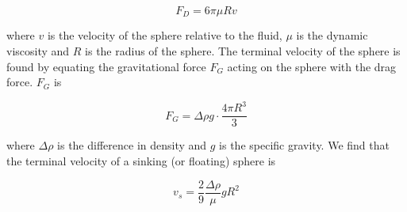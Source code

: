 \begin{equation}
F_D = 6\pi \mu R v
\end{equation}

where $v$ is the velocity of the sphere relative to the fluid, $\mu$ is the dynamic viscosity and $R$ is the radius of the sphere. The terminal velocity of the sphere is found by equating the gravitational force $F_G$ acting on the sphere with the drag force. $F_G$ is

\begin{equation}
F_G = \Delta \rho g\cdot \frac{4\pi R^3}{3}
\end{equation}

where $\Delta \rho$ is the difference in density and $g$ is the specific gravity. We find that the terminal velocity of a sinking (or floating) sphere is

\begin{equation}\label{eq:fallingSphere}
v_s = \frac{2}{9} \frac{\Delta \rho}{\mu} g R^2
\end{equation}

%

